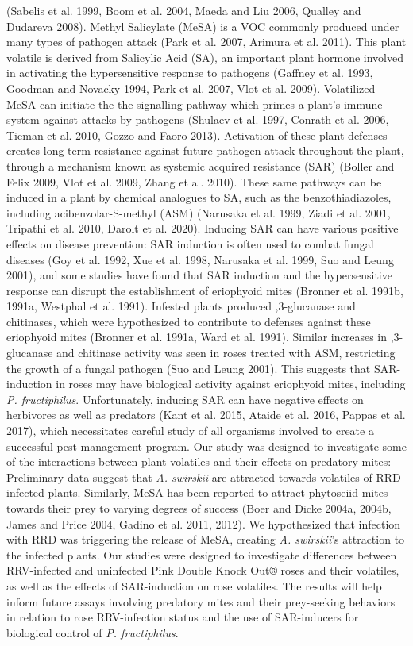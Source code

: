 \documentclass[12pt,final,CPage]{ufthesis}
\begin{document}
{(Sabelis et al. 1999, Boom et al. 2004, Maeda and Liu 2006, Qualley and Dudareva 2008). Methyl Salicylate (MeSA) is a VOC commonly produced under many types of pathogen attack (Park et al. 2007, Arimura et al. 2011). This plant volatile is derived from Salicylic Acid (SA), an important plant hormone involved in activating the hypersensitive response to pathogens (Gaffney et al. 1993, Goodman and Novacky 1994, Park et al. 2007, Vlot et al. 2009). Volatilized MeSA can initiate the the signalling pathway which primes a plant's immune system against attacks by pathogens (Shulaev et al. 1997, Conrath et al. 2006, Tieman et al. 2010, Gozzo and Faoro 2013). Activation of these plant defenses creates long term resistance against future pathogen attack throughout the plant, through a mechanism known as systemic acquired resistance (SAR) (Boller and Felix 2009, Vlot et al. 2009, Zhang et al. 2010). These same pathways can be induced in a plant by chemical analogues to SA, such as the benzothiadiazoles, including acibenzolar-S-methyl (ASM) (Narusaka et al. 1999, Ziadi et al. 2001, Tripathi et al. 2010, Darolt et al. 2020). Inducing SAR can have various positive effects on disease prevention: SAR induction is often used to combat fungal diseases (Goy et al. 1992, Xue et al. 1998, Narusaka et al. 1999, Suo and Leung 2001), and some studies have found that SAR induction and the hypersensitive response can disrupt the establishment of eriophyoid mites (Bronner et al. 1991b, 1991a, Westphal et al. 1991). Infested plants produced ,3-glucanase and chitinases, which were hypothesized to contribute to defenses against these eriophyoid mites (Bronner et al. 1991a, Ward et al. 1991). Similar increases in ,3-glucanase and chitinase activity was seen in roses treated with ASM, restricting the growth of a fungal pathogen (Suo and Leung 2001). This suggests that SAR-induction in roses may have biological activity against eriophyoid mites, including \emph{P. fructiphilus}. Unfortunately, inducing SAR can have negative effects on herbivores as well as predators (Kant et al. 2015, Ataide et al. 2016, Pappas et al. 2017), which necessitates careful study of all organisms involved to create a successful pest management program. Our study was designed to investigate some of the interactions between plant volatiles and their effects on predatory mites: Preliminary data suggest that \emph{A. swirskii} are attracted towards volatiles of RRD-infected plants. Similarly, MeSA has been reported to attract phytoseiid mites towards their prey to varying degrees of success (Boer and Dicke 2004a, 2004b, James and Price 2004, Gadino et al. 2011, 2012). We hypothesized that infection with RRD was triggering the release of MeSA, creating \emph{A. swirskii}'s attraction to the infected plants. Our studies were designed to investigate differences between RRV-infected and uninfected Pink Double Knock Out® roses and their volatiles, as well as the effects of SAR-induction on rose volatiles. The results will help inform future assays involving predatory mites and their prey-seeking behaviors in relation to rose RRV-infection status and the use of SAR-inducers for biological control of \emph{P. fructiphilus}.

}
\end{document}
